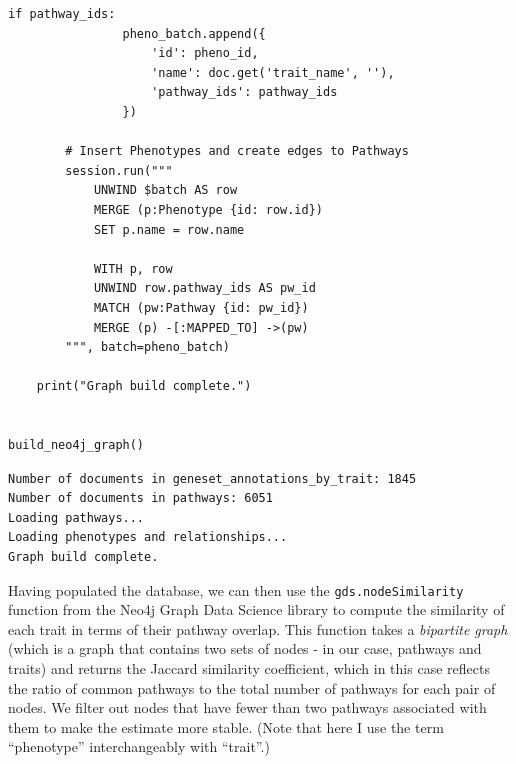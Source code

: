 \begin{lstlisting}[style=Python]
            if pathway_ids:
                pheno_batch.append({
                    'id': pheno_id,
                    'name': doc.get('trait_name', ''),
                    'pathway_ids': pathway_ids
                })

        # Insert Phenotypes and create edges to Pathways
        session.run("""
            UNWIND $batch AS row
            MERGE (p:Phenotype {id: row.id})
            SET p.name = row.name
            
            WITH p, row
            UNWIND row.pathway_ids AS pw_id
            MATCH (pw:Pathway {id: pw_id})
            MERGE (p) -[:MAPPED_TO] ->(pw)
        """, batch=pheno_batch)

    print("Graph build complete.")


build_neo4j_graph()
\end{lstlisting}

\begin{lstlisting}[style=shell]
Number of documents in geneset_annotations_by_trait: 1845
Number of documents in pathways: 6051
Loading pathways...
Loading phenotypes and relationships...
Graph build complete.
\end{lstlisting}

Having populated the database, we can then use the \texttt{gds.nodeSimilarity} function from the Neo4j Graph Data Science library to compute the similarity of each trait in terms of their pathway overlap.  This function takes a \textit{bipartite graph} (which is a graph that contains two sets of nodes - in our case, pathways and traits) and returns the Jaccard similarity coefficient, which in this case reflects the ratio of common pathways to the total number of pathways for each pair of nodes. We filter out nodes that have fewer than two pathways associated with them to make the estimate more stable. (Note that here I use the term ``phenotype'' interchangeably with ``trait''.)

